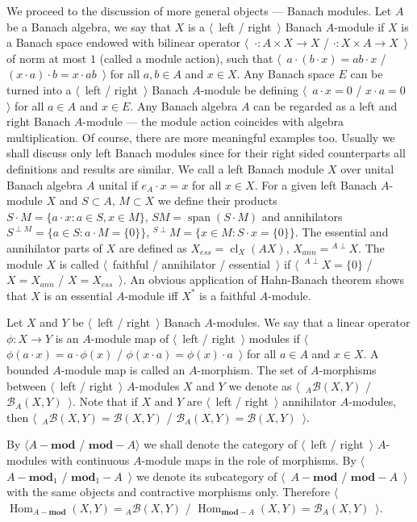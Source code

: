 We proceed to the discussion of more general objects --- Banach modules. Let $A$ be a Banach algebra, we say that $X$ is a $\langle$~left / right~$\rangle$ Banach $A$-module if $X$ is a Banach space endowed with bilinear operator $\langle$~$\cdot:A\times X\to X$ / $\cdot: X\times A\to X$~$\rangle$ of norm at most $1$ (called a module action), such that $\langle$~$a\cdot(b\cdot x)=ab\cdot x$ / $(x\cdot a)\cdot b=x\cdot ab$~$\rangle$ for all $a,b\in A$ and $x\in X$. Any Banach space $E$ can be turned into a $\langle$~left / right~$\rangle$ Banach $A$-module be defining $\langle$~$a\cdot x=0$ / $x\cdot a=0$~$\rangle$ for all $a\in A$ and $x\in E$. Any Banach algebra $A$ can be regarded as a left and right Banach $A$-module --- the module action coincides with algebra multiplication. Of course, there are more meaningful examples too.  Usually we shall discuss only left Banach modules since for their right sided counterparts all definitions and results are similar. We call a left Banach module $X$ over unital Banach algebra $A$ unital if $e_A\cdot x=x$ for all $x\in X$. For a given left Banach $A$-module $X$ and $S\subset A$, $M\subset X$ we define their products $S\cdot M=\{a\cdot x:a\in S, x\in M\}$, $SM=\operatorname{span} (S\cdot M)$ and annihilators $S^{\perp M}=\{a\in S:a\cdot M=\{0\}\}$, ${}^{S\perp}M=\{x\in M: S\cdot x=\{0\}\}$. The essential and annihilator parts of $X$ are defined as $X_{ess}=\operatorname{cl}_X(A X)$, $X_{ann}={}^{A\perp}X$. The module $X$ is called $\langle$~faithful / annihilator / essential~$\rangle$ if $\langle$~${}^{A\perp}X=\{0\}$ / $X=X_{ann}$ / $X=X_{ess}$~$\rangle$. An obvious application of Hahn-Banach theorem shows that $X$ is an essential $A$-module iff $X^*$ is a faithful $A$-module.

Let $X$ and $Y$ be $\langle$~left / right~$\rangle$ Banach $A$-modules. We say that a linear operator $\phi:X\to Y$ is an $A$-module map of $\langle$~left / right~$\rangle$ modules if $\langle$~$\phi(a\cdot x)=a\cdot \phi(x)$ / $\phi(x\cdot a)=\phi(x)\cdot a$~$\rangle$ for all $a\in A$ and $x\in X$. A bounded $A$-module map is called an $A$-morphism. The set of $A$-morphisms between $\langle$~left / right~$\rangle$ $A$-modules $X$ and $Y$ we denote as $\langle$~${}_A\mathcal{B}(X,Y)$ / $\mathcal{B}_A(X,Y)$~$\rangle$. Note that if $X$ and $Y$ are $\langle$~left / right~$\rangle$ annihilator $A$-modules, then $\langle$~${}_A\mathcal{B}(X,Y)=\mathcal{B}(X,Y)$ / $\mathcal{B}_A(X,Y)=\mathcal{B}(X,Y)$~$\rangle$.

By $\langle A-\mathbf{mod}$ / $\mathbf{mod}-A\rangle$ we shall denote the category of $\langle$~left / right~$\rangle$ $A$-modules with continuous $A$-module maps in the role of morphisms. By $\langle$~$A-\mathbf{mod}_1$ / $\mathbf{mod}_1-A$~$\rangle$ we denote its subcategory of $\langle$~$A-\mathbf{mod}$ / $\mathbf{mod}-A$~$\rangle$ with the same objects and contractive morphisms only. Therefore $\langle$~ $\operatorname{Hom}_{A-\mathbf{mod}}(X,Y)={}_A\mathcal{B}(X,Y)$ /  $\operatorname{Hom}_{\mathbf{mod}-A}(X,Y)=\mathcal{B}_A(X,Y)$~$\rangle$. 

